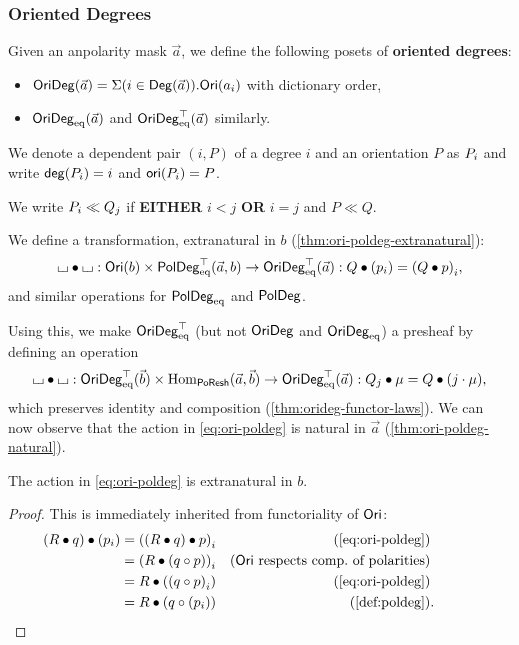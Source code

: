 \documentclass[a4paper]{memoir}
\begin{document}
\subsubsection{Oriented Degrees}
\begin{definition}
	Given an anpolarity mask $\vec a$, we define the following posets of \textbf{oriented degrees}:
	\begin{itemize}
		\item $\mathsf{OriDeg}(\vec a) = \Sigma(i \in {\mathsf{Deg}}(\vec a)).{\mathsf{Ori}}(a_i)$ with dictionary order,
		\item $\mathsf{OriDeg}_{\mathrm{eq}}(\vec a)$ and $\mathsf{OriDeg}_{\mathrm{eq}}^\top(\vec a)$ similarly.
	\end{itemize}
	We denote a dependent pair $(i, P)$ of a degree $i$ and an orientation $P$ as ${P}_{i}$ and write $\mathsf{deg}({P}_{i}) = i$ and $\mathsf{ori}({P}_{i}) = P$.
	
	We write ${P}_{i} \ll {Q}_{j}$ if \textbf{EITHER} $i < j$ \textbf{OR} $i = j$ and $P \ll Q$.
	
	We define a transformation, extranatural in $b$ (\cref{thm:ori-poldeg-extranatural}):
	\begin{equation}
		{\llcorner\hspace{-.4ex}\lrcorner} \mathbin{\bullet} {\llcorner\hspace{-.4ex}\lrcorner} : {\mathsf{Ori}}(b) \times \mathsf{PolDeg}_{\mathrm{eq}}^\top(\vec a, b) \to \mathsf{OriDeg}_{\mathrm{eq}}^\top(\vec a) : Q \mathbin{\bullet} ({p}_{i}) = {(Q \mathbin{\bullet} p)}_{i}, \label{eq:ori-poldeg}
	\end{equation}
	and similar operations for $\mathsf{PolDeg}_{\mathrm{eq}}$ and $\mathsf{PolDeg}$.
	
	Using this, we make $\mathsf{OriDeg}_{\mathrm{eq}}^\top$ (but not $\mathsf{OriDeg}$ and $\mathsf{OriDeg}_{\mathrm{eq}}$) a presheaf by defining an operation
	\begin{equation} \label{eq:orideg-poresh}
		{\llcorner\hspace{-.4ex}\lrcorner} \mathbin{\bullet} {\llcorner\hspace{-.4ex}\lrcorner} : \mathsf{OriDeg}_{\mathrm{eq}}^\top(\vec b) \times {\mathrm{Hom}}_{\mathsf{PoResh}}(\vec a, \vec b) \to \mathsf{OriDeg}_{\mathrm{eq}}^\top(\vec a) : Q_j \mathbin{\bullet} \mu = Q \mathbin{\bullet} (j \cdot \mu),
	\end{equation}
	which preserves identity and composition (\cref{thm:orideg-functor-laws}).
	We can now observe that the action in \cref{eq:ori-poldeg} is natural in $\vec a$ (\cref{thm:ori-poldeg-natural}).
\end{definition}
\begin{proposition} \label{thm:ori-poldeg-extranatural}
	The action in \cref{eq:ori-poldeg} is extranatural in $b$.
\end{proposition}
\begin{proof}
	This is immediately inherited from functoriality of ${\mathsf{Ori}}$:
	\begin{align*}
		(R \oriof q) \oriof (\pdeg p i)
		&= \pdeg{((R \oriof q) \oriof p)}{i}
		& \text{(\cref{eq:ori-poldeg})} \\
		&= \pdeg{(R \oriof (q \circ p))}{i}
		& \text{($\oripsh$ respects comp.\ of polarities)} \\
		&= R \oriof (\pdeg{(q \circ p)}{i})
		& \text{(\cref{eq:ori-poldeg})} \\
		&= R \oriof (q \circ (\pdeg p i))
		& \text{(\cref{def:poldeg})} &. \qquad \qedhere
	\end{align*}
\end{proof}
\end{document}
